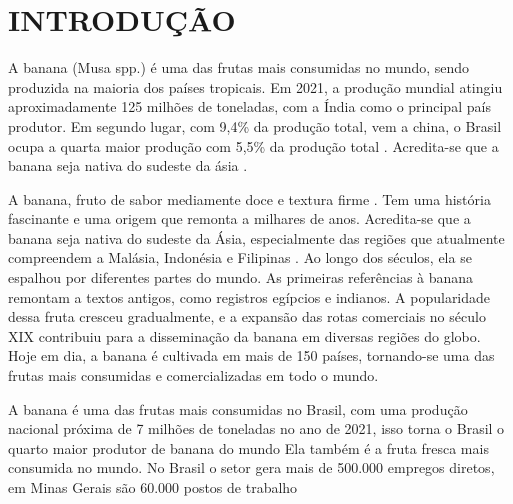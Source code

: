 \chapter{INTRODUÇÃO}

 A banana (Musa spp.) é uma das frutas mais consumidas no mundo, sendo produzida na maioria dos países tropicais. Em 2021, a produção mundial atingiu aproximadamente 125 milhões de toneladas, com a Índia como o principal país produtor. Em segundo lugar, com 9,4\% da produção total, vem a china, o Brasil ocupa a quarta maior produção com 5,5\% da produção total \cite{banana}. Acredita-se que a banana seja nativa do sudeste da ásia \cite{1956TaOo}.

A banana, fruto de sabor mediamente doce e textura firme \cite{MATSUURA2004}. Tem uma história fascinante e uma origem que remonta a milhares de anos. Acredita-se que a banana seja nativa do sudeste da Ásia, especialmente das regiões que atualmente compreendem a Malásia, Indonésia e Filipinas \cite{1956TaOo}. Ao longo dos séculos, ela se espalhou por diferentes partes do mundo. As primeiras referências à banana remontam a textos antigos, como registros egípcios e indianos. A popularidade dessa fruta cresceu gradualmente, e a expansão das rotas comerciais no século XIX contribuiu para a disseminação da banana em diversas regiões do globo. Hoje em dia, a banana é cultivada em mais de 150 países, tornando-se uma das frutas mais consumidas e comercializadas em todo o mundo.

A banana é uma das frutas mais consumidas no Brasil, com uma produção nacional próxima de 7 milhões de toneladas no ano de 2021, isso torna o Brasil o quarto maior produtor de banana do mundo \cite{banana} Ela também é a fruta fresca mais consumida no mundo. No Brasil o setor gera mais de 500.000 empregos diretos, em Minas Gerais são 60.000 postos de trabalho